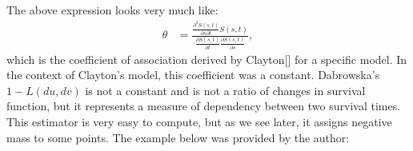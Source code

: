 \documentclass[]{article}
\begin{document}
The above expression looks very much like:
	$$
	\begin{aligned}
		\theta &= \frac{ \frac{\partial^2 S(s,t)}{\partial s \partial t} S(s, t)}    {\frac{\partial S(s, t)}{\partial t} \frac{\partial S(s, t)}{\partial s}},
	\end{aligned}
	$$
which is the coefficient of association derived by Clayton[\cite{clayton1978model}] for a specific model. In the context of  Clayton's model, this coefficient was a constant. Dabrowska's  $1-L(du, dv)$ is not a constant and is not a ratio of changes in survival function, but it represents a measure of dependency between two survival times. 
This estimator is very easy to compute, but as we see later, it assigns negative mass to some points. The example below was provided by the author:

%
%
%
\end{document}
